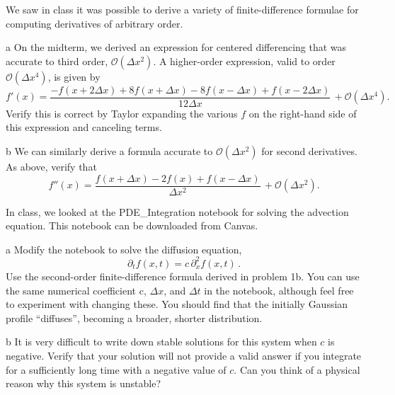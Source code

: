 \documentclass[]{homework}
\begin{document}

\begin{problem}{1} 
  We saw in class it was possible to derive a variety of finite-difference formulae for
  computing derivatives of arbitrary order.

  \begin{subproblem}{a}
    On the midterm, we derived an expression for centered differencing that was accurate
    to third order, $\mathcal{O}(\Delta x^2)$. A higher-order expression, valid to order
    $\mathcal{O}(\Delta x^4)$, is given by
    \[
      f'(x) = \frac{-f(x+2\Delta x) + 8f(x+\Delta x) - 8f(x-\Delta x) + f(x-2\Delta x)}{12 \Delta x}\, + \mathcal{O}(\Delta x^4).
    \]
    Verify this is correct by Taylor expanding the various $f$ on the right-hand
    side of this expression and canceling terms.
  \end{subproblem}

  \begin{subproblem}{b}
    We can similarly derive a formula accurate to $\mathcal{O}(\Delta x^2)$
    for second derivatives. As above, verify that
    \[
      f''(x) = \frac{f(x+\Delta x) - 2f(x) + f(x-\Delta x)}{\Delta x^2}\,+ \mathcal{O}(\Delta x^2).
    \]
  \end{subproblem}

\end{problem}


\begin{problem}{2}
  In class, we looked at the PDE\_Integration notebook for solving the
  advection equation. This notebook can be downloaded from Canvas.
  \begin{subproblem}{a}
    Modify the notebook to solve the diffusion equation,
    \[
      \partial_t f(x, t) = c\, \partial_x^2 f(x, t)\,.
    \]
    Use the second-order finite-difference formula derived in problem 1b.
    You can use the same numerical coefficient c,
    $\Delta x$, and $\Delta t$ in the notebook, although feel free
    to experiment with changing these. You should find that the initially
    Gaussian profile ``diffuses'', becoming a broader, shorter distribution.
  \end{subproblem}
  \begin{subproblem}{b}
    It is very difficult to write down stable solutions for this system when
    $c$ is negative. Verify that your solution will not
    provide a valid answer if you integrate for a sufficiently long time with
    a negative value of $c$.
    Can you think of a physical reason why this system is unstable?
  \end{subproblem}
\end{problem}
\end{document}
